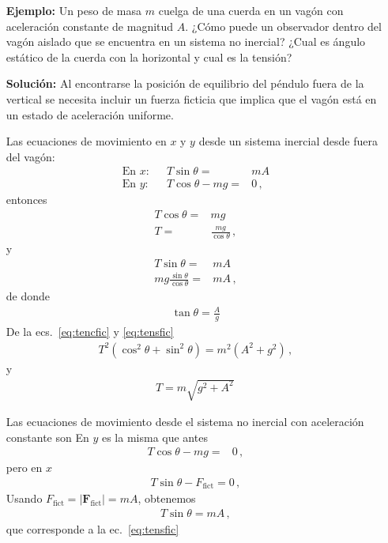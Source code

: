 \begin{itemize}
\item[\textbf{Ejemplo:}] Un peso de masa $m$ cuelga de una cuerda en un vagón con aceleración constante de magnitud $A$. ¿Cómo puede un observador dentro del vagón aislado que se encuentra en un sistema no inercial? ¿Cual es ángulo estático de la cuerda con la horizontal y cual es la tensión?

\item[\textbf{Solución:}] 
Al encontrarse la posición de equilibrio del péndulo fuera de la vertical se necesita incluir un fuerza ficticia que implica que el vagón está en un estado de aceleración uniforme.

Las ecuaciones de movimiento en $x$ y $y$ desde un sistema inercial desde fuera del vagón:
\begin{align*}
  \text{En $x$:}&&T\sin\theta=&m A\nonumber\\
  \text{En $y$:}&&T\cos\theta-m g=&0\,,
\end{align*}
entonces
\begin{align}
  \label{eq:tencfic}
  T\cos\theta=&mg\nonumber\\
  T=&\frac{m g}{\cos\theta}\,,
\end{align}
y
\begin{align}
  \label{eq:tensfic}
  T\sin\theta=&m A\nonumber\\
  {m g}\frac{\sin\theta}{\cos\theta}=&mA\,,
\end{align}
de donde
\begin{align*}
  \tan\theta=\frac{A}{g}
\end{align*}
De la ecs.~\eqref{eq:tencfic} y \eqref{eq:tensfic}
\begin{align*}
  T^2(\cos^2\theta+\sin^2\theta)=m^2(A^2+g^2)\,,
\end{align*}
y
\begin{align*}
  T=m\sqrt{g^2+A^2}\,
\end{align*}

Las ecuaciones de movimiento desde el sistema no inercial con aceleración constante son
En $y$ es la misma que antes
\begin{align*}
  T\cos\theta-mg=&0\,,
\end{align*}
pero en $x$
\begin{align*}
    T\sin\theta-F_{\text{fict}}=0\,,
\end{align*}
Usando $F_{\text{fict}}=|\mathbf{F}_{\text{fict}}|=m A$, obtenemos
\begin{align*}
  T\sin\theta=m A\,,
\end{align*}
que corresponde a la ec.~\eqref{eq:tensfic}
\end{itemize}





